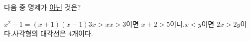 다음 중 명제가 \underline{아닌} 것은?
\begin{choicesv}{$x^2-1=(x+1)(x-1)$}{$3x>x$}{$x>3$이면 $x+2>5$이다.}{$x<y$이면 $2x>2y$이다.}{사각형의 대각선은 $4$개이다.}\end{choicesv}
